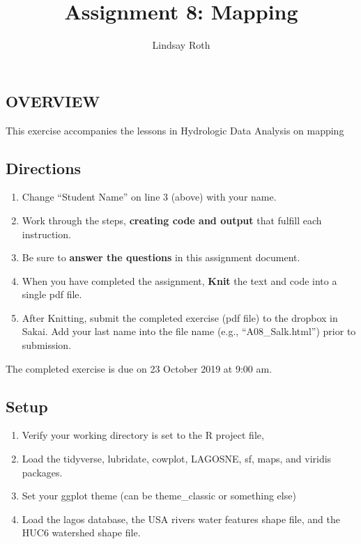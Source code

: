 \documentclass[]{article}
\title{Assignment 8: Mapping}
\author{Lindsay Roth}
\date{}
\providecommand{\tightlist}{%
  \setlength{\itemsep}{0pt}\setlength{\parskip}{0pt}}
\begin{document}
\maketitle

\hypertarget{overview}{%
\subsection{OVERVIEW}\label{overview}}

This exercise accompanies the lessons in Hydrologic Data Analysis on
mapping

\hypertarget{directions}{%
\subsection{Directions}\label{directions}}

\begin{enumerate}
\def\labelenumi{\arabic{enumi}.}
\tightlist
\item
  Change ``Student Name'' on line 3 (above) with your name.
\item
  Work through the steps, \textbf{creating code and output} that fulfill
  each instruction.
\item
  Be sure to \textbf{answer the questions} in this assignment document.
\item
  When you have completed the assignment, \textbf{Knit} the text and
  code into a single pdf file.
\item
  After Knitting, submit the completed exercise (pdf file) to the
  dropbox in Sakai. Add your last name into the file name (e.g.,
  ``A08\_Salk.html'') prior to submission.
\end{enumerate}

The completed exercise is due on 23 October 2019 at 9:00 am.

\hypertarget{setup}{%
\subsection{Setup}\label{setup}}

\begin{enumerate}
\def\labelenumi{\arabic{enumi}.}
\tightlist
\item
  Verify your working directory is set to the R project file,
\item
  Load the tidyverse, lubridate, cowplot, LAGOSNE, sf, maps, and viridis
  packages.
\item
  Set your ggplot theme (can be theme\_classic or something else)
\item
  Load the lagos database, the USA rivers water features shape file, and
  the HUC6 watershed shape file.
\end{enumerate}
\end{document}
